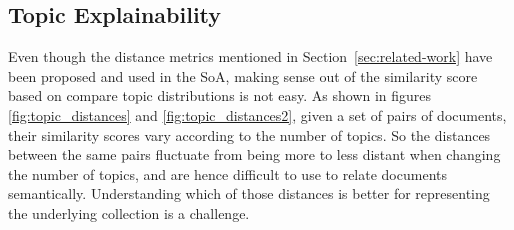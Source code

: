 \subsection{Topic Explainability}
\label{sec:topic-explainability}

Even though the distance metrics mentioned in Section~\ref{sec:related-work} have been proposed and used in the SoA, making sense out of the similarity score based on compare topic distributions is not easy. As shown in figures \ref{fig:topic_distances} and \ref{fig:topic_distances2}, given a set of pairs of documents, their similarity scores vary according to the number of topics. So the distances between the same pairs fluctuate from being more to less distant when changing the number of topics, and are hence difficult to use to relate documents semantically. Understanding which of those distances is better for representing the underlying collection is a challenge.


